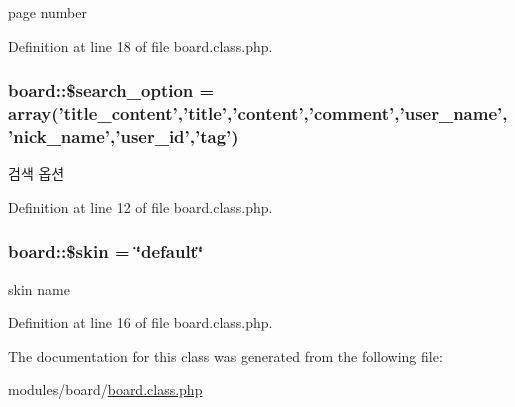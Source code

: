 page number 



Definition at line 18 of file board.\-class.\-php.

\hypertarget{classboard_a6affe0c86966ebd06572cc4c8abde32b}{
\subsubsection[{\$search\-\_\-option}]{\setlength{\rightskip}{0pt plus 5cm}board\-::\$search\-\_\-option = array('title\-\_\-content','{\bf title}','{\bf content}','{\bf comment}','{\bf user\-\_\-name}','{\bf nick\-\_\-name}','{\bf user\-\_\-id}','{\bf tag}')}}\label{classboard_a6affe0c86966ebd06572cc4c8abde32b}


검색 옵션 



Definition at line 12 of file board.\-class.\-php.

\hypertarget{classboard_ac7e864ad1db563c4d3f97291dd90291f}{
\subsubsection[{\$skin}]{\setlength{\rightskip}{0pt plus 5cm}board\-::\$skin = \char`\"{}default\char`\"{}}}\label{classboard_ac7e864ad1db563c4d3f97291dd90291f}


skin name 



Definition at line 16 of file board.\-class.\-php.



The documentation for this class was generated from the following file\-:\begin{DoxyCompactItemize}
\item 
modules/board/\hyperlink{board_8class_8php}{board.\-class.\-php}\end{DoxyCompactItemize}
